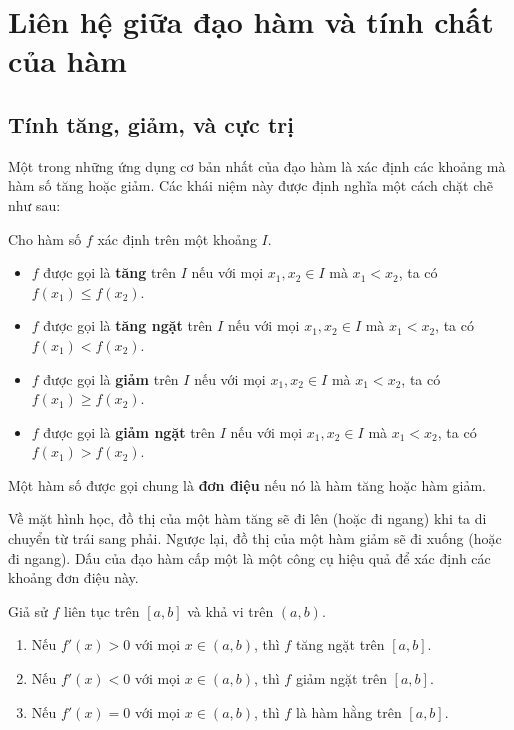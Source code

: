 \section{Liên hệ giữa đạo hàm và tính chất của hàm}
\label{sec:derivative-properties}

\subsection{Tính tăng, giảm, và cực trị}
\label{subsec:monotonicity-extrema}

Một trong những ứng dụng cơ bản nhất của đạo hàm là xác định các khoảng mà hàm số tăng hoặc giảm. Các khái niệm này được định nghĩa một cách chặt chẽ như sau:

\begin{definition}
Cho hàm số $f$ xác định trên một khoảng $I$.
\begin{itemize}
    \item $f$ được gọi là \textbf{tăng} trên $I$ nếu với mọi $x_1, x_2 \in I$ mà $x_1 < x_2$, ta có $f(x_1) \le f(x_2)$.
    \item $f$ được gọi là \textbf{tăng ngặt} trên $I$ nếu với mọi $x_1, x_2 \in I$ mà $x_1 < x_2$, ta có $f(x_1) < f(x_2)$.
    \item $f$ được gọi là \textbf{giảm} trên $I$ nếu với mọi $x_1, x_2 \in I$ mà $x_1 < x_2$, ta có $f(x_1) \ge f(x_2)$.
    \item $f$ được gọi là \textbf{giảm ngặt} trên $I$ nếu với mọi $x_1, x_2 \in I$ mà $x_1 < x_2$, ta có $f(x_1) > f(x_2)$.
\end{itemize}
Một hàm số được gọi chung là \textbf{đơn điệu} nếu nó là hàm tăng hoặc hàm giảm.
\end{definition}

Về mặt hình học, đồ thị của một hàm tăng sẽ đi lên (hoặc đi ngang) khi ta di chuyển từ trái sang phải. Ngược lại, đồ thị của một hàm giảm sẽ đi xuống (hoặc đi ngang). Dấu của đạo hàm cấp một là một công cụ hiệu quả để xác định các khoảng đơn điệu này.

\begin{theorem}
\label{thm:monotonicity-test}
Giả sử $f$ liên tục trên $[a, b]$ và khả vi trên $(a, b)$.
\begin{enumerate}[label=(\alph*)]
    \item Nếu $f'(x) > 0$ với mọi $x \in (a, b)$, thì $f$ tăng ngặt trên $[a, b]$.
    \item Nếu $f'(x) < 0$ với mọi $x \in (a, b)$, thì $f$ giảm ngặt trên $[a, b]$.
    \item Nếu $f'(x) = 0$ với mọi $x \in (a, b)$, thì $f$ là hàm hằng trên $[a, b]$.
\end{enumerate}
\end{theorem}


